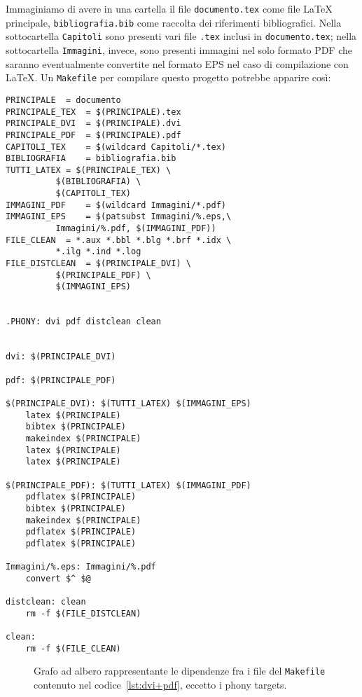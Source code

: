 Immaginiamo di avere in una cartella il file \texttt{documento.tex} come file
\LaTeX{}
principale, \texttt{bibliografia.bib} come raccolta dei riferimenti
bibliografici.  Nella sottocartella \texttt{Capitoli} sono presenti vari file
\texttt{.tex} inclusi in \texttt{documento.tex}; nella sottocartella
\texttt{Immagini}, invece, sono presenti immagini nel solo formato \textsc{PDF}
che saranno eventualmente convertite nel formato \textsc{EPS} nel caso di
compilazione con \LaTeX.  Un \texttt{Makefile} per compilare questo progetto
potrebbe apparire così:
\begin{lstlisting}[caption={\texttt{Makefile} in cui la prima regola compila il
documento in \textsc{DVI} convertendo le immagini \textsc{PDF} in \textsc{EPS},
la seconda regola compila in formato \textsc{PDF}.},
label=lst:dvi+pdf]
PRINCIPALE 	= documento
PRINCIPALE_TEX	= $(PRINCIPALE).tex
PRINCIPALE_DVI	= $(PRINCIPALE).dvi
PRINCIPALE_PDF	= $(PRINCIPALE).pdf
CAPITOLI_TEX	= $(wildcard Capitoli/*.tex)
BIBLIOGRAFIA	= bibliografia.bib
TUTTI_LATEX	= $(PRINCIPALE_TEX) \
		  $(BIBLIOGRAFIA) \
		  $(CAPITOLI_TEX)
IMMAGINI_PDF	= $(wildcard Immagini/*.pdf)
IMMAGINI_EPS	= $(patsubst Immagini/%.eps,\
		  Immagini/%.pdf, $(IMMAGINI_PDF))
FILE_CLEAN	= *.aux *.bbl *.blg *.brf *.idx \
		  *.ilg *.ind *.log
FILE_DISTCLEAN	= $(PRINCIPALE_DVI) \
		  $(PRINCIPALE_PDF) \
		  $(IMMAGINI_EPS)


.PHONY: dvi pdf distclean clean


dvi: $(PRINCIPALE_DVI)

pdf: $(PRINCIPALE_PDF)

$(PRINCIPALE_DVI): $(TUTTI_LATEX) $(IMMAGINI_EPS)
	latex $(PRINCIPALE)
	bibtex $(PRINCIPALE)
	makeindex $(PRINCIPALE)
	latex $(PRINCIPALE)
	latex $(PRINCIPALE)

$(PRINCIPALE_PDF): $(TUTTI_LATEX) $(IMMAGINI_PDF)
	pdflatex $(PRINCIPALE)
	bibtex $(PRINCIPALE)
	makeindex $(PRINCIPALE)
	pdflatex $(PRINCIPALE)
	pdflatex $(PRINCIPALE)

Immagini/%.eps: Immagini/%.pdf
	convert $^ $@

distclean: clean
	rm -f $(FILE_DISTCLEAN)

clean:
	rm -f $(FILE_CLEAN)
\end{lstlisting}
\begin{figure}
  \centering
  \caption{Grafo ad albero rappresentante le dipendenze fra i file del
    \texttt{Makefile} contenuto nel codice~\ref{lst:dvi+pdf}, eccetto i phony
    targets.}
  \label{fig:grafo-albero2}
\end{figure}

